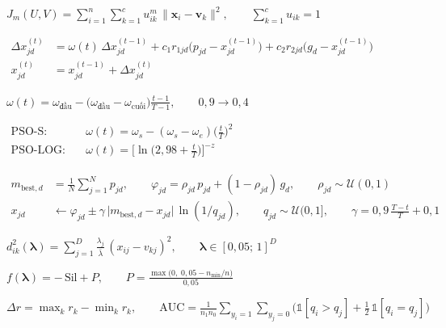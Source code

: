 \documentclass[12pt]{article}
\newcommand{\cg}[1]{\clearpage\noindent\begin{minipage}{27cm}\Large #1\end{minipage}}
\begin{document}
\cg{$\displaystyle J_m(U,V)=\sum_{i=1}^{n}\sum_{k=1}^{c}u_{ik}^{m}\,\lVert \mathbf{x}_i-\mathbf{v}_k\rVert^{2},\qquad \sum_{k=1}^{c}u_{ik}=1$}
\cg{$\begin{aligned}\Delta x_{jd}^{(t)}&=\omega(t)\,\Delta x_{jd}^{(t-1)}+c_1 r_{1jd}\big(p_{jd}-x_{jd}^{(t-1)}\big)+c_2 r_{2jd}\big(g_{d}-x_{jd}^{(t-1)}\big)\\ x_{jd}^{(t)}&=x_{jd}^{(t-1)}+\Delta x_{jd}^{(t)}\end{aligned}$}
\cg{$\displaystyle \omega(t)=\omega_{\text{đầu}}-\big(\omega_{\text{đầu}}-\omega_{\text{cuối}}\big)\frac{t-1}{T-1},\qquad 0{,}9\to 0{,}4$}
\cg{$\begin{aligned}\text{PSO-S:}\quad&\omega(t)=\omega_s-(\omega_s-\omega_e)\Big(\frac{t}{T}\Big)^{2}\\ \text{PSO-LOG:}\quad&\omega(t)=\Big[\ln\Big(2{,}98+\frac{t}{T}\Big)\Big]^{-z}\end{aligned}$}
\cg{$\begin{aligned}m_{\text{best},d}&=\frac{1}{N}\sum_{j=1}^{N}p_{jd},\qquad \varphi_{jd}=\rho_{jd}\,p_{jd}+(1-\rho_{jd})\,g_{d},\qquad \rho_{jd}\sim\mathcal{U}(0,1)\\ x_{jd}&\leftarrow\varphi_{jd}\pm\gamma\,\big|m_{\text{best},d}-x_{jd}\big|\,\ln(1/q_{jd}),\qquad q_{jd}\sim\mathcal{U}(0,1],\qquad \gamma=0{,}9\,\frac{T-t}{T}+0{,}1\end{aligned}$}
\cg{$\displaystyle d_{ik}^{2}(\symbf{\lambda})=\sum_{j=1}^{D}\frac{\lambda_j}{\bar{\lambda}}\,(x_{ij}-v_{kj})^{2},\qquad \symbf{\lambda}\in[0{,}05;\,1]^{D}$}
\cg{$\displaystyle f(\symbf{\lambda})=-\,\mathrm{Sil}+P,\qquad P=\frac{\max\big(0,\;0{,}05-n_{\min}/n\big)}{0{,}05}$}
\cg{$\displaystyle \Delta r=\max_k r_k-\min_k r_k,\qquad \mathrm{AUC}=\frac{1}{n_1 n_0}\sum_{y_i=1}\sum_{y_j=0}\Big(\mathbb{1}[q_i>q_j]+\tfrac12\,\mathbb{1}[q_i=q_j]\Big)$}
\end{document}
